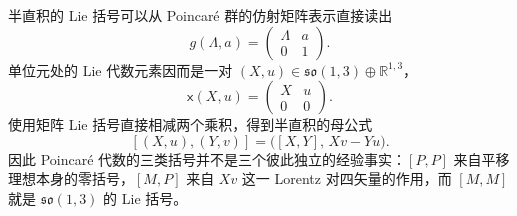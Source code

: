 半直积的 Lie 括号可以从 Poincar\'e 群的仿射矩阵表示直接读出
\begin{equation}
 {
 g(\Lambda,a)=
 \begin{pmatrix}
 \Lambda & a\\
 0&1
 \end{pmatrix}.}
 \label{eq:poincare-affine-matrix-dp75}
\end{equation}
单位元处的 Lie 代数元素因而是一对 $(X,u)\in\mathfrak{so}(1,3)\oplus\mathbb R^{1,3}$，
\begin{equation*}
 \mathsf x(X,u)=
 \begin{pmatrix}
 X&u\\
 0&0
 \end{pmatrix}.
\end{equation*}
使用矩阵 Lie 括号直接相减两个乘积，得到半直积的母公式
\begin{equation}
 {
 [(X,u),(Y,v)]
 =\bigl([X,Y],\,Xv-Yu\bigr).}
 \label{eq:poincare-semidir-lie-bracket-dp75}
\end{equation}
因此 Poincar\'e 代数的三类括号并不是三个彼此独立的经验事实：$[P,P]$ 来自平移理想本身的零括号，$[M,P]$ 来自 $Xv$ 这一 Lorentz 对四矢量的作用，而 $[M,M]$ 就是 $\mathfrak{so}(1,3)$ 的 Lie 括号。

